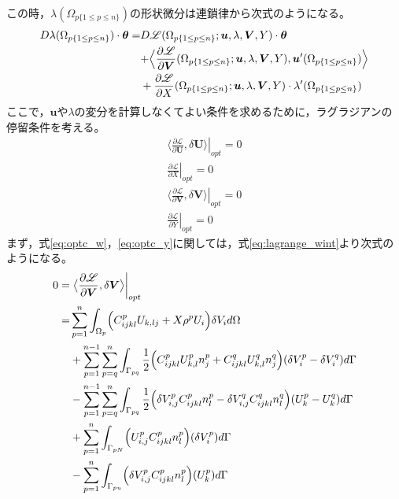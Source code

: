 この時，$\lambda(\Omega_{p\{1\leq p\leq n\}})$の形状微分は連鎖律から次式のようになる。
\begin{align}
	D\lambda(\Omega_{p\{1\leq p\leq n\}})\cdot\bm{\theta}
	=&D\mathscr{L}(\Omega_{p\{1\leq p\leq n\}};\bm{u},\lambda,\bm{V},Y)\cdot\bm{\theta}
	\nonumber
	\\
	&+\Bigr\langle \frac{\partial \mathscr{L}}{\partial \bm{V}}(\Omega_{p\{1\leq p\leq n\}};\bm{u},\lambda,\bm{V},Y),
	\bm{u}'(\Omega_{p\{1\leq p\leq n\}}) \Bigl\rangle
	\nonumber
	\\
	&+\frac{\partial \mathscr{L}}{\partial X}(\Omega_{p\{1\leq p\leq n\}};\bm{u},\lambda,\bm{V},Y)\cdot
	\lambda'(\Omega_{p\{1\leq p\leq n\}})
	\label{eq:shape_lagrange}
\end{align}
ここで，$\bm{u}$や$\lambda$の変分を計算しなくてよい条件を求めるために，ラグラジアンの停留条件を考える。
\begin{align}
	\left.\bigr\langle \frac{\partial \mathscr{L}}{\partial \bm{U}},\delta \bm{U} \bigl\rangle\right|_{opt}=0
	\label{eq:optc_v}
	\\
	\left.\frac{\partial\mathscr{L}}{\partial X}\right|_{opt}=0
	\label{eq:optc_x}
	\\
	\left.\bigr\langle \frac{\partial \mathscr{L}}{\partial \bm{V}},\delta \bm{V} \bigl\rangle\right|_{opt}=0
	\label{eq:optc_w}
	\\
	\left.\frac{\partial\mathscr{L}}{\partial Y}\right|_{opt}=0
	\label{eq:optc_y}
\end{align}
まず，式\eqref{eq:optc_w}，\eqref{eq:optc_y}に関しては，式\eqref{eq:lagrange_wint}より次式のようになる。
\begin{align}
	0=&\left.\bigr\langle \frac{\partial \mathscr{L}}{\partial \bm{V}},\delta \bm{V} \bigl\rangle\right|_{opt}
	\nonumber
	\\
	=&\sum_{p=1}^{n}\int_{\Omega_p}\Bigr(C_{ijkl}^{p}U_{k,lj}+X\rho^{p}U_{i}\Bigl)\delta V_{i} d\Omega
	\nonumber
	\\
	&+\sum_{p=1}^{n-1}\sum_{p=q}^{n}\int_{\Gamma_{pq}}\frac{1}{2}\Bigr(C_{ijkl}^{p}U_{k,l}^{p}n_{j}^{p}+C_{ijkl}^{q}U_{k,l}^{q}n_{j}^{q}\Bigl)(\delta V_{i}^{p}-\delta V_{i}^{q}) d\Gamma
	\nonumber
	\\
	&-\sum_{p=1}^{n-1}\sum_{p=q}^{n}\int_{\Gamma_{pq}}\frac{1}{2}\Bigr(\delta V_{i,j}^{p}C_{ijkl}^{p}n_{l}^{p}-\delta V_{i,j}^{q}C_{ijkl}^{q}n_{l}^{q}\Bigl)(U_{k}^{p}-U_{k}^{q})d\Gamma
	\nonumber
	\\
	&+\sum_{p=1}^{n}\int_{\Gamma_{pN}}\Bigr(U_{i,j}^{p}C_{ijkl}^{p}n_{l}^{p}\Bigl)(\delta V_{i}^{p}) d\Gamma
	\nonumber
	\\
	&-\sum_{p=1}^{n}\int_{\Gamma_{pu}}\Bigr(\delta V_{i,j}^{p}C_{ijkl}^{p}n_{l}^{p}\Bigl)(U_{k}^{p}) d\Gamma
	\label{eq:lagrange_wderivative}
\end{align}
